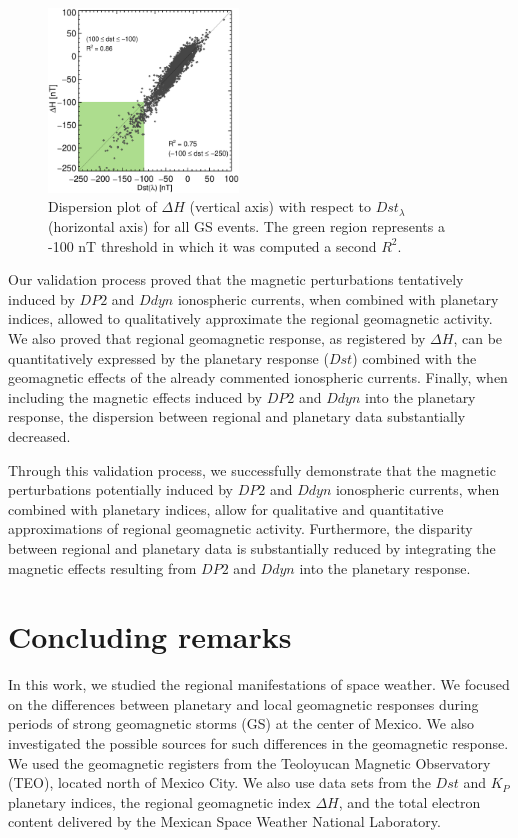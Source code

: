 \documentclass[a4paper,fleqn]{cas-dc}
\begin{document}
\begin{figure}
    \centering
     \includegraphics[width=0.45\textwidth]{dispersion_general_dst_ld.eps}
      \caption{Dispersion plot of $\Delta H$ (vertical axis) with respect to $Dst_\lambda$ (horizontal axis) for all GS events. The green region represents a -100 nT threshold in which it was computed a second $R^2$.}
       \label{fig:valid_disp2}
\end{figure}

Our validation process proved that the magnetic perturbations tentatively induced by $DP2$ and $Ddyn$ ionospheric currents, when combined with planetary indices, allowed to qualitatively approximate the regional geomagnetic activity. We also proved that regional geomagnetic response, as registered by $\Delta H$, can be quantitatively expressed by the planetary response ($Dst$) combined with the geomagnetic effects of the already commented ionospheric currents. Finally, when including the magnetic effects induced by $DP2$ and $Ddyn$ into the planetary response, the dispersion between regional and planetary data substantially decreased.

Through this validation process, we successfully demonstrate that the magnetic perturbations potentially induced by $DP2$ and $Ddyn$ ionospheric currents, when combined with planetary indices, allow for qualitative and quantitative approximations of regional geomagnetic activity. Furthermore, the disparity between regional and planetary data is substantially reduced by integrating the magnetic effects resulting from $DP2$ and $Ddyn$ into the planetary response.

\section{Concluding remarks}

In this work, we studied the regional manifestations of space weather. We focused on the differences between planetary and local geomagnetic responses during periods of strong geomagnetic storms (GS) at the center of Mexico. We also investigated the possible sources for such differences in the geomagnetic response. We used the geomagnetic registers from the Teoloyucan Magnetic Observatory (TEO), located north of Mexico City. We also use data sets from the $Dst$ and $K_P$ planetary indices, the regional geomagnetic index $\Delta H$, and the total electron content delivered by the Mexican Space Weather National Laboratory.
\end{document}
